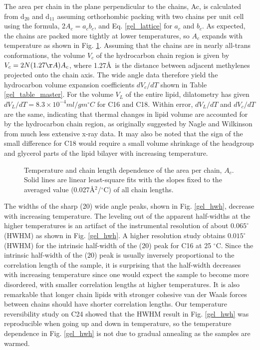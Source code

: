 The area per chain in the plane perpendicular to the chains, Ac, 
is calculated from d$_{20}$ and d$_{11}$ assuming orthorhombic packing 
with two chains per unit cell using the 
formula, 2$A_{c} = a_c b_c$, and Eq. \ref{gel_lattice} for $a_c$ and $b_c$.
As expected, the chains are packed more tightly at lower temperatures,
so $A_c$ expands with temperature as shown in Fig. \ref{gel_lac}.
Assuming that the chains are in nearly all-trans conformations,
the volume $V_c$ of the hydrocarbon chain region is given by
$V_c = 2N(1.27\AA)A_c$, where 1.27\AA\ is the distance between
adjacent methylenes projected onto the chain axis.
The wide angle data therefore yield the hydrocarbon
volume expansion coefficients $dV_c/dT$ shown in Table \ref{gel_table_master}.  
For the volume $V_L$ of the entire lipid, dilatometry \cite{NW78}
has given
$dV_L/dT = 8.3\times 10^{-4}ml/gm{^{\circ}C}$
for C16 and C18.  Within error, $dV_L/dT$ and $dV_c/dT$ are
the same, indicating that thermal changes in lipid volume are accounted
for by the hydrocarbon chain region, as originally suggested by Nagle 
and  Wilkinson \cite{NW78} from much less extensive x-ray data. It may
also be noted that the sign of the small difference for
C18 would require a small volume shrinkage of the headgroup and glycerol
parts of the lipid bilayer with increasing temperature.

\begin{figure}
\centerline {}
\caption{Temperature and chain length dependence of
the area per chain, $A_c$.
Solid lines are linear least-square fits with the slopes fixed
to the averaged value (0.027\AA$^2$/$^{\circ}$C) of all chain
lengths. 
\label{gel_lac}}
\end{figure}

The widths of the sharp (20) wide angle peaks, shown in Fig. \ref{gel_hwh},
decrease with increasing temperature.  The leveling out of 
the apparent half-widths at the higher temperatures is an artifact of the 
instrumental resolution of about $0.065^{\circ}$(HWHM) as shown in 
Fig. \ref{gel_hwh}. A higher resolution 
study \cite{Sun94} obtains $0.015^{\circ}$(HWHM) for the intrinsic 
half-width of the (20) peak for C16 at 25 $^{\circ}$C.  
Since the intrinsic half-width of the
(20) peak is usually inversely proportional to the correlation length of the 
sample, it is surprising that the half-width decreases with increasing 
temperature since one would expect the sample to become more disordered, with 
smaller correlation lengths at higher temperatures.  It is also
remarkable that longer chain lipids with stronger cohesive
van der Waals forces between chains should have shorter correlation lengths.
Our temperature reversibility study on C24 \cite{Sun95} showed that the 
HWHM result in Fig. \ref{gel_hwh} was reproducible when going 
up and down in temperature,
so the temperature dependence in Fig. \ref{gel_hwh} is not due to 
gradual annealing as the samples are warmed.

